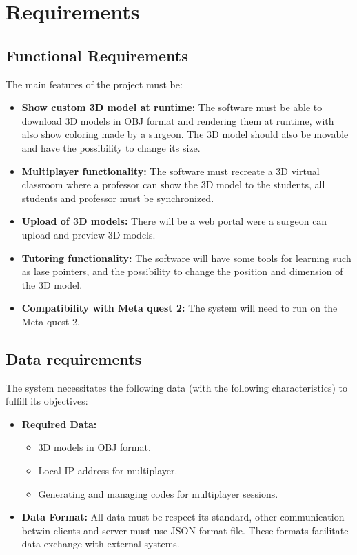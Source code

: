 
\chapter{Requirements}
\label{chp:Requirements}

\section{Functional Requirements}
\noindent
The main features of the project must be:

\begin{itemize}
  \item \textbf{Show custom 3D model at runtime:} The software must be able to download 3D models in OBJ format and rendering them at runtime, with also show coloring made by a surgeon. The 3D model should also be movable and have the possibility to change its size.
  \item \textbf{Multiplayer functionality:} The software must recreate a 3D virtual classroom where a professor can show the 3D model to the students, all students and professor must be synchronized.
  \item \textbf{Upload of 3D models:} There will be a web portal were a surgeon can upload and preview 3D models.
  \item \textbf{Tutoring functionality:} The software will have some tools for learning such as lase pointers, and the possibility to change the position and dimension of the 3D model.
  \item \textbf{Compatibility with Meta quest 2:} The system will need to run on the Meta quest 2.
\end{itemize}

\section{Data requirements}
\noindent
The system necessitates the following data (with the following characteristics) to fulfill its objectives:

\begin{itemize}
  \item \textbf{Required Data:} 
  \begin{itemize}
    \item 3D models in OBJ format.
    \item Local \ac{IP} address for multiplayer.
    \item Generating and managing codes for multiplayer sessions.
  \end{itemize}
  \item \textbf{Data Format:} All data must be respect its standard, other communication betwin clients and server must use \ac{JSON} format file.
  These formats facilitate data exchange with external systems.
\end{itemize}

